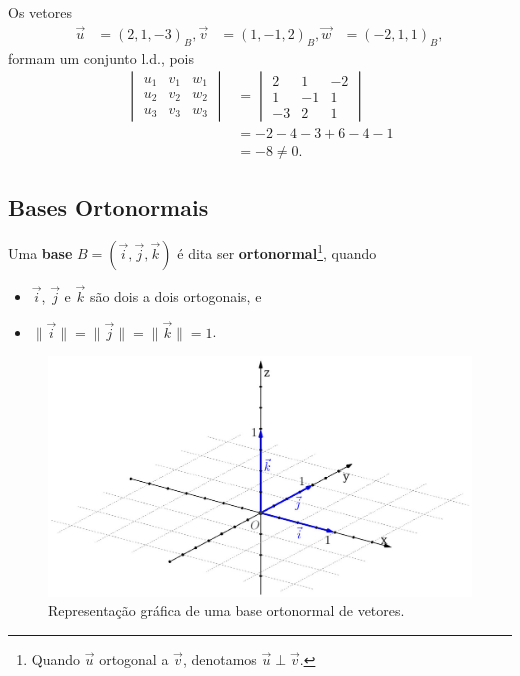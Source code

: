 \begin{ex}
  Os vetores 
  \begin{align}
    \vec{u} &= (2,1,-3)_B,
    \vec{v} &= (1,-1,2)_B,
    \vec{w} &= (-2,1,1)_B,
  \end{align}
  formam um conjunto l.d., pois
  \begin{align}
    \begin{vmatrix}
      u_1 & v_1 & w_1\\
      u_2 & v_2 & w_2\\
      u_3 & v_3 & w_3
    \end{vmatrix} &=
    \begin{vmatrix}
      2 & 1 & -2\\
      1 & -1 & 1\\
      -3 & 2 & 1
    \end{vmatrix} \\
    &= -2-4-3+6-4-1 \\
    &= -8\neq 0.
  \end{align}
\end{ex}

\subsection{Bases Ortonormais}

Uma \textbf{base} $B = (\vec{i}, \vec{j}, \vec{k})$ é dita ser \textbf{ortonormal}\footnote{Quando $\vec{u}$ ortogonal a $\vec{v}$, denotamos $\vec{u}\perp\vec{v}$.}, quando
\begin{itemize}
\item $\vec{i}$, $\vec{j}$ e $\vec{k}$ são dois a dois ortogonais, e
\item $\|\vec{i}\|=\|\vec{j}\|=\|\vec{k}\|=1$.
\end{itemize}

\begin{figure}[h]
  \centering
  \includegraphics[width=5in]{./cap_base/dados/fig_base_ortonormal/fig.jpg}
  \caption{Representação gráfica de uma base ortonormal de vetores.}
  \label{cap_base_sec_base:fig:base_ortonormal}
\end{figure}

